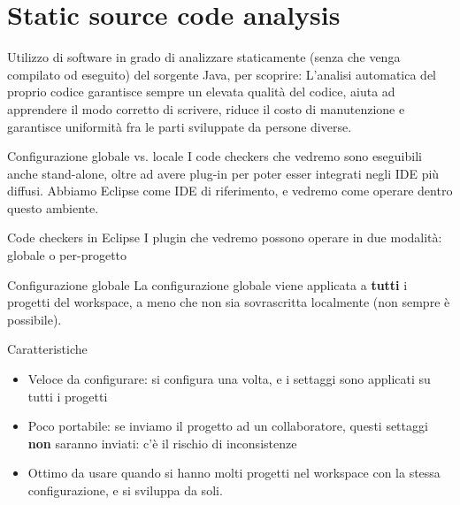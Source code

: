 \documentclass[presentation]{beamer}
\begin{document}
\section{Static source code analysis}

 {
	 {
		Utilizzo di software in grado di analizzare staticamente (senza che venga compilato od eseguito) del sorgente Java, per scoprire:
	}
	 {
		L'analisi automatica del proprio codice garantisce sempre un elevata qualità del codice, aiuta ad apprendere il modo corretto di scrivere, riduce il costo di manutenzione e garantisce uniformità fra le parti sviluppate da persone diverse.
	}
}

\begin{frame}{Configurazione globale vs. locale}
  I code checkers che vedremo sono eseguibili anche stand-alone, oltre ad avere plug-in per poter esser integrati negli IDE più diffusi. Abbiamo Eclipse come IDE di riferimento, e vedremo come operare dentro questo ambiente.
  \begin{block}{Code checkers in Eclipse}
    I plugin che vedremo possono operare in due modalità: globale o per-progetto
  \end{block}
\end{frame}

\begin{frame}{Configurazione globale}
  La configurazione globale viene applicata a \textbf{tutti} i progetti del workspace, a meno che non sia sovrascritta localmente (non sempre è possibile).
  \begin{block}{Caratteristiche}
    \begin{itemize}
      \item Veloce da configurare: si configura una volta, e i settaggi sono applicati su tutti i progetti
      \item Poco portabile: se inviamo il progetto ad un collaboratore, questi settaggi \textbf{non} saranno inviati: c'è il rischio di inconsistenze
      \item Ottimo da usare quando si hanno molti progetti nel workspace con la stessa configurazione, e si sviluppa da soli.
    \end{itemize}
  \end{block}
\end{frame}
\end{document}
